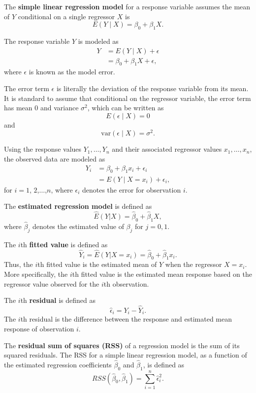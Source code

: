 \documentclass[
]{book}
\theoremstyle{definition}
\theoremstyle{definition}
\theoremstyle{definition}
\theoremstyle{definition}
\theoremstyle{remark}
\begin{document}
The \textbf{simple linear regression model} for a response variable assumes the mean of \(Y\) conditional on a single regressor \(X\) is
\[
E(Y\mid X) = \beta_0 + \beta_1 X.
\]

The response variable \(Y\) is modeled as
\[
\begin{aligned}
Y &= E(Y \mid X) + \epsilon \\
&= \beta_0 + \beta_1 X + \epsilon,
\end{aligned}
\label{eq:slr-model-Y}
\]
where \(\epsilon\) is known as the model error.

The error term \(\epsilon\) is literally the deviation of the response variable from its mean.
It is standard to assume that conditional on the regressor variable, the error term has mean 0 and variance \(\sigma^2\), which can be written as
\[
E(\epsilon \mid X) = 0 \label{eq:error-mean}
\]
and
\[
\mathrm{var}(\epsilon \mid X) = \sigma^2.\label{eq:error-var}
\]

Using the response values \(Y_1, \ldots, Y_n\) and their associated regressor values \(x_1, \ldots, x_n\), the observed data are modeled as
\[
\begin{aligned}
Y_i &= \beta_0 + \beta_1 x_i + \epsilon_i \\
&= E(Y\mid X = x_i) + \epsilon_i,
\end{aligned}
\]
for \(i=1\), \(2\),\(\ldots\),\(n\), where \(\epsilon_i\) denotes the error for observation \(i\).

The \textbf{estimated regression model} is defined as
\[\hat{E}(Y|X) = \hat{\beta}_0 + \hat{\beta}_1 X,\]
where \(\hat{\beta}_j\) denotes the estimated value of \(\beta_j\) for \(j=0,1\).

The \(i\)th \textbf{fitted value} is defined as
\[
\hat{Y}_i = \hat{E}(Y|X = x_i) = \hat{\beta}_0 + \hat{\beta}_1 x_i. \label{eq:def-fitted-value-slr}
\]
Thus, the \(i\)th fitted value is the estimated mean of \(Y\) when the regressor \(X=x_i\). More specifically, the \(i\)th fitted value is the estimated mean response based on the regressor value observed for the \(i\)th observation.

The \(i\)th \textbf{residual} is defined as
\[
\hat{\epsilon}_i = Y_i - \hat{Y}_i. \label{eq:def-residual-slr}
\]
The \(i\)th residual is the difference between the response and estimated
mean response of observation \(i\).

The \textbf{residual sum of squares (RSS)} of a regression model is the sum of its squared residuals. The RSS for a simple linear regression model, as a function of the estimated regression coefficients \(\hat{\beta}_0\) and \(\hat{\beta}_1\), is defined as
\[
RSS(\hat{\beta}_0, \hat{\beta}_1) = \sum_{i=1}^n \hat{\epsilon}_i^2. \label{eq:def-rss-slr}
\]
\end{document}
